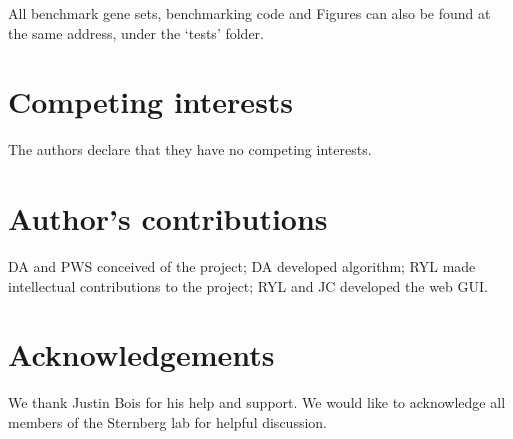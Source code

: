 \documentclass{bmcart}
\begin{document}
All benchmark gene sets, benchmarking code and Figures can also be found at the same address, under the `tests' folder.

\begin{backmatter}

\section*{Competing interests}
 	The authors declare that they have no competing interests.
\section*{Author's contributions}
    DA and PWS conceived of the project; DA developed algorithm;
	RYL made intellectual contributions to the project; RYL and JC
	developed the web GUI.
\section*{Acknowledgements}
	We thank Justin Bois for his help and support. 
	We would like to acknowledge all members of the Sternberg
	lab for helpful discussion.

\nocite{label}


\end{backmatter}
\end{document}
